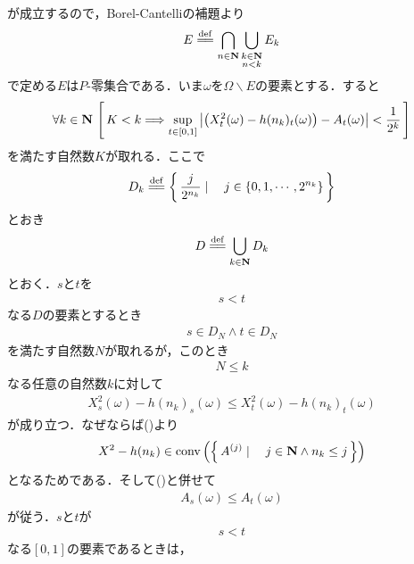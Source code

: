 \begin{sketch}
\begin{description}
\begin{align}
				\end{align}
				が成立するので，Borel-Cantelliの補題より
				\begin{align}
					E \defeq \bigcap_{n \in \Natural} \bigcup_{\substack{k \in \Natural \\ n < k}} E_k
				\end{align}
				で定める$E$は$P$-零集合である．いま$\omega$を$\Omega \backslash E$の要素とする．すると
				\begin{align}
					\forall k \in \mathbf{N}\,
					\left[\, K < k \Longrightarrow \operatorname*{sup}_{t \in [0,1]} \left|\left(X^2_t(\omega) - h(n_k)_t(\omega)\right) - A_t(\omega)\right| < \frac{1}{2^k}\, \right]
					\label{fom:thm_decomposition_of_square_integrable_martingales_4}
				\end{align}
				を満たす自然数$K$が取れる．ここで
				\begin{align}
					D_k \defeq \Set{\frac{j}{2^{n_k}}}{j \in \{0,1,\cdots,2^{n_k}\}}
				\end{align}
				とおき
				\begin{align}
					D \defeq \bigcup_{k \in \Natural} D_k
				\end{align}
				とおく．$s$と$t$を
				\begin{align}
					s < t
				\end{align}
				なる$D$の要素とするとき
				\begin{align}
					s \in D_N \wedge t \in D_N
				\end{align}
				を満たす自然数$N$が取れるが，このとき
				\begin{align}
					N \leq k
				\end{align}
				なる任意の自然数$k$に対して
				\begin{align}
					X^2_s(\omega) - h(n_k)_s(\omega) \leq X^2_t(\omega) - h(n_k)_t(\omega)
				\end{align}
				が成り立つ．なぜならば()より
				\begin{align}
					X^2 - h(n_k) \in \operatorname*{conv} \left(\left\{\, A^{(j)} \mid \quad j \in \mathbf{N} \wedge n_k \leq j\, \right\}\right)
				\end{align}
				となるためである．そして()と併せて
				\begin{align}
					A_s(\omega) \leq A_t(\omega)
				\end{align}
				が従う．$s$と$t$が
				\begin{align}
					s < t
				\end{align}
				なる$[0,1]$の要素であるときは，

\end{description}
\end{sketch}
